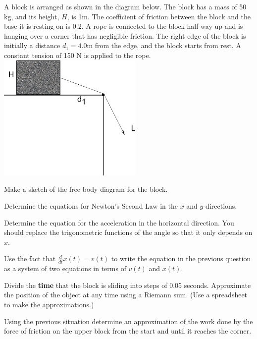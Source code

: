 \begin{problem}
\item A block is arranged as shown in the diagram below. The block has
  a mass of 50 kg, and its height, $H$, is 1m.  The coefficient of
  friction between the block and the base it is resting on is 0.2. A
  rope is connected to the block half way up and is hanging over a
  corner that has negligible friction. The right edge of the block is
  initially a distance $d_1=4.0$m from the edge, and the block starts
  from rest. A constant tension of 150 N is applied to the rope. \\
  \includegraphics[width=7cm]{ink/week10/hangingBlocks}

  \begin{subproblem}
    \item Make a sketch of the free body diagram for the block.
      \vfill
    \item Determine the equations for Newton's Second Law in the $x$
      and $y$-directions.
      \vfill
      \clearpage
    \item Determine the equation for the acceleration in the
      horizontal direction. You should replace the trigonometric
      functions of the angle so that it only depends on $x$.
      \vfill
    \item Use the fact that $\frac{d}{dt} x(t) = v(t)$ to write the
      equation in the previous question as a system of two equations
      in terms of $v(t)$ and $x(t)$.
      \vfill

      \clearpage

    \item Divide the \textbf{time} that the block is sliding into
      steps of 0.05 seconds. Approximate the position of the object at
      any time using a Riemann sum. (Use a spreadsheet to make the
      approximations.)

      \clearpage

  \end{subproblem}

  \clearpage

\item Using the previous situation determine an approximation of the
  work done by the force of friction on the upper block from the start
  and until it reaches the corner.

  \vfill

\end{problem}

